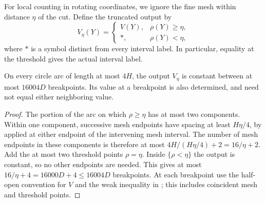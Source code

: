 For local counting in rotating coordinates, we ignore the fine mesh
within distance $\eta$ of the cut. Define the truncated output by
\begin{equation}\label{mesh:truncation-definition}
 V_\eta(Y)=
 \begin{cases}
 V(Y),&\rho(Y)\ge\eta,\\
 *,&\rho(Y)<\eta,
 \end{cases}
\end{equation}
where $*$ is a symbol distinct from every interval label. In particular,
equality at the threshold gives the actual interval label.

\begin{lemma}\label{mesh:truncated}
On every circle arc of length at most $4H$, the output $V_\eta$ is
constant between at most $16004D$ breakpoints. Its value at a
breakpoint is also determined, and need not equal either neighboring
value.
\end{lemma}

\begin{proof}
The portion of the arc on which $\rho\ge\eta$ has at most two
components. Within one component, successive mesh endpoints have
spacing at least $H\eta/4$, by  applied at either
endpoint of the intervening mesh interval. The number of mesh
endpoints in these components is therefore at most
$4H/(H\eta/4)+2=16/\eta+2$. Add the at most two threshold points
$\rho=\eta$. Inside $\{\rho<\eta\}$ the output is constant, so no
other endpoints are needed. This gives at most
$16/\eta+4=16000D+4\le16004D$ breakpoints. At each breakpoint use
the half-open convention for $V$ and the weak inequality in
; this includes coincident mesh and
threshold points.
\end{proof}
